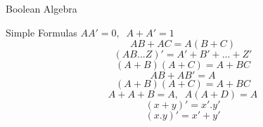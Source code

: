 \newpage
\begin{section}{Boolean Algebra}
	\begin{subsection}{Simple Formulas}
		$AA'=0, \; \; A+A' = 1 $
		$$AB + AC = A(B+C)$$
		$$(AB ... Z)' = A' + B' + ... + Z'$$
		$$(A+B)(A+C) = A + BC $$
		$$AB + AB' = A$$
		$$(A+B)(A+C) = A + BC $$
		$$A + A + B = A , \; \; A(A+D) = A$$
		$$(x+y)' = x'.y' $$
		$$(x.y)' = x' + y' $$
	\end{subsection}
\end{section}
